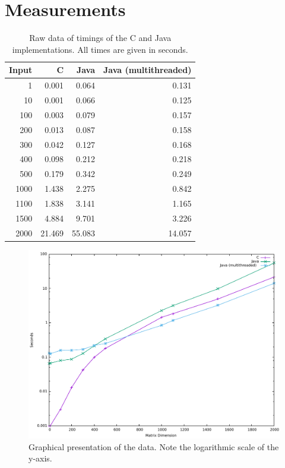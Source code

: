\documentclass{article}
\begin{document}
	\section{Measurements}
	\begin{table}[H]
		\centering
		\begin{tabular}{|r|r|r|r|}
			\hline
			Input	& C			& Java		& Java (multithreaded)\\\hline
			1		&  0.001	&  0.064	& 0.131\\\hline
			10		&  0.001	&  0.066	& 0.125\\\hline
			100		&  0.003	&  0.079	& 0.157\\\hline
			200		&  0.013	&  0.087	& 0.158\\\hline
			300		&  0.042	&  0.127	& 0.168\\\hline
			400		&  0.098	&  0.212	& 0.218\\\hline
			500		&  0.179	&  0.342	& 0.249\\\hline
			1000	&  1.438	&  2.275	& 0.842\\\hline
			1100	&  1.838	&  3.141	& 1.165\\\hline
			1500	&  4.884	&  9.701	& 3.226\\\hline
			2000	& 21.469	& 55.083	& 14.057\\\hline
		\end{tabular}
		\caption{Raw data of timings of the C and Java implementations. All times are given in seconds.}
	\end{table}
	
	\begin{figure}[H]
		\includegraphics[width=\textwidth]{AppliedAlgorithmsMatrixMultiplicationPlots.pdf}
		\caption{Graphical presentation of the data. Note the logarithmic scale of the y-axis.}
		\label{fig:plots}
	\end{figure}
\end{document}
